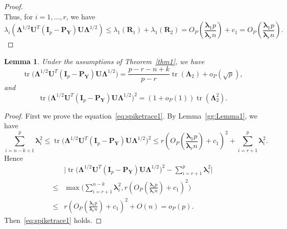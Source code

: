 \documentclass[12pt]{article} %
\DeclareMathOperator{\mytr}{tr}
\newcommand{\bP}{\mathbf{P}}
\newcommand{\bY}{\mathbf{Y}}
\newcommand{\bR}{\mathbf{R}}
\newcommand{\bI}{\mathbf{I}}
\newcommand{\bU}{\mathbf{U}}
\newcommand{\bfsym}[1]{\ensuremath{\boldsymbol{#1}}}
\def\blambda {\bfsym {\lambda}}
\def\bLambda {\bfsym {\Lambda}}
\newtheorem{lemma}{Lemma}
\theoremstyle{definition}
\begin{document}
\begin{appendices}
\begin{proof}
$$$$
Thus, for $i=1,\ldots, r$, we have
    $$\lambda_i(\bLambda^{1/2}\bU^T (\bI_p-\bP_{\bY})\bU\bLambda^{1/2})
        \leq \lambda_1(\bR_1)+\lambda_1(\bR_2)= O_P(\frac{\blambda_1 p}{\blambda_r n}) + c_1=O_P(\frac{\blambda_1 p}{\blambda_r n}).
    $$
\end{proof}
\begin{lemma}\label{gg:Lemma2}
    Under the assumptions of Theorem~\ref{thm1}, we have
    \begin{equation}\label{eq:spiketrace2}
        \mytr\big(\bLambda^{1/2} \bU^T (\bI_p-\bP_{\bY})\bU \bLambda^{1/2}\big)
= \frac{p-r-n+k}{p-r}\mytr(\bLambda_2)+o_P(\sqrt{p}),
\end{equation}
and
    \begin{equation}\label{eq:spiketrace1}
    \mytr\big(\bLambda^{1/2} \bU^T (\bI_p-\bP_{\bY})\bU \bLambda^{1/2}\big)^2 
 =(1+o_P(1))\mytr(\bLambda_2^2).
    \end{equation}
\end{lemma}
\begin{proof}
    First we prove the equation~\eqref{eq:spiketrace1}.
    By Lemma~\ref{gg:Lemma1}, we have
$$
    \sum_{i=n-k+1}^p \blambda_i^2\leq \mytr\big(\bLambda^{1/2} \bU^T (\bI_p-\bP_{\bY})\bU \bLambda^{1/2}\big)^2 \leq  r(O_P(\frac{\blambda_1 p}{\blambda_r n})+c_1)^2+\sum_{i=r+1}^p \blambda_i^2.
$$
    Hence
    \begin{equation*}
        \begin{aligned}
        &\big|\mytr\big(\bLambda^{1/2} \bU^T (\bI_p-\bP_{\bY})\bU \bLambda^{1/2}\big)^2 - \sum_{i=r+1}^p \blambda_i^2 \big|\\
        \leq &
            \max\Big(\sum_{i=r+1}^{n-k} \blambda_i^2 , r(O_P(\frac{\blambda_1 p}{\blambda_r n})+c_1)^2\Big)\\
        \leq &
            r(O_P(\frac{\blambda_1 p}{\blambda_r n})+c_1)^2+O(n)=o_P(p).
        \end{aligned}
    \end{equation*}
    Then~\eqref{eq:spiketrace1} holds.


\end{proof}
\end{appendices}
\end{document}
